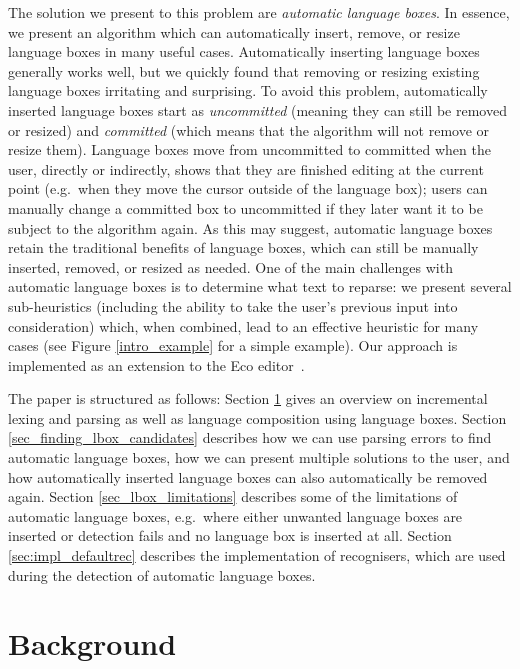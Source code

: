 \documentclass[sigplan,screen]{acmart}\settopmatter{printfolios=true,printccs=false,printacmref=false}
\begin{document}
The solution we present to this problem are \emph{automatic language boxes}. In
essence, we present an algorithm which can automatically insert, remove, or resize language
boxes in many useful cases. Automatically inserting language boxes generally
works well, but we quickly found that removing or resizing existing language boxes
irritating and surprising. To avoid this problem, automatically inserted
language boxes start as \emph{uncommitted} (meaning they can still be
removed or resized) and \emph{committed} (which means that the algorithm will
not remove or resize them). Language boxes
move from uncommitted to committed when the user, directly or indirectly, shows
that they are finished editing at the current point (e.g.~when they move the
cursor outside of the language box); users can manually change a committed box to uncommitted if they later
want it to be subject to the algorithm again. As this may suggest, automatic
language boxes retain the traditional benefits of language boxes, which can still
be manually inserted, removed, or resized as needed. One of the main challenges with
automatic language boxes is to determine what text to reparse: we present
several sub-heuristics (including the ability to take the user's previous input
into consideration) which, when combined, lead to an effective heuristic for
many cases (see Figure \ref{intro_example} for a simple example). Our
approach is implemented as an extension to the Eco editor~\cite{diekmann14eco}.

The paper is structured as follows: Section \ref{sec_background} gives an
overview on incremental lexing and parsing as well as language composition
using language boxes. Section \ref{sec_finding_lbox_candidates}
describes how we can use parsing errors to find automatic language boxes, how
we can present multiple solutions to the user, and how automatically inserted
language boxes can also automatically be removed again. Section
\ref{sec_lbox_limitations} describes some of the limitations of automatic
language boxes, e.g.~where either unwanted language boxes are inserted or
detection fails and no language box is inserted at all. Section
\ref{sec:impl_defaultrec} describes the implementation of recognisers, which
are used during the detection of automatic language boxes.



\section{Background}
\label{sec_background}
\end{document}
